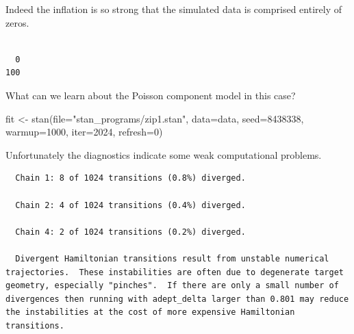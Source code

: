 \documentclass[
  letterpaper,
  DIV=11,
  numbers=noendperiod]{scrartcl}
\newenvironment{Shaded}{\begin{snugshade}}{\end{snugshade}}
\newcommand{\AttributeTok}[1]{\textcolor[rgb]{0.40,0.45,0.13}{#1}}
\newcommand{\DecValTok}[1]{\textcolor[rgb]{0.68,0.00,0.00}{#1}}
\newcommand{\FunctionTok}[1]{\textcolor[rgb]{0.28,0.35,0.67}{#1}}
\newcommand{\NormalTok}[1]{\textcolor[rgb]{0.00,0.23,0.31}{#1}}
\newcommand{\OtherTok}[1]{\textcolor[rgb]{0.00,0.23,0.31}{#1}}
\newcommand{\SpecialCharTok}[1]{\textcolor[rgb]{0.37,0.37,0.37}{#1}}
\newcommand{\StringTok}[1]{\textcolor[rgb]{0.13,0.47,0.30}{#1}}
\begin{document}
Indeed the inflation is so strong that the simulated data is comprised
entirely of zeros.

\begin{Shaded}
\end{Shaded}

\begin{verbatim}

  0 
100 
\end{verbatim}

What can we learn about the Poisson component model in this case?

\begin{Shaded}
\begin{Highlighting}[]
\NormalTok{fit }\OtherTok{\textless{}{-}} \FunctionTok{stan}\NormalTok{(}\AttributeTok{file=}\StringTok{"stan\_programs/zip1.stan"}\NormalTok{,}
            \AttributeTok{data=}\NormalTok{data, }\AttributeTok{seed=}\DecValTok{8438338}\NormalTok{,}
            \AttributeTok{warmup=}\DecValTok{1000}\NormalTok{, }\AttributeTok{iter=}\DecValTok{2024}\NormalTok{, }\AttributeTok{refresh=}\DecValTok{0}\NormalTok{)}
\end{Highlighting}
\end{Shaded}

Unfortunately the diagnostics indicate some weak computational problems.

\begin{Shaded}
\end{Shaded}

\begin{verbatim}
  Chain 1: 8 of 1024 transitions (0.8%) diverged.

  Chain 2: 4 of 1024 transitions (0.4%) diverged.

  Chain 4: 2 of 1024 transitions (0.2%) diverged.

  Divergent Hamiltonian transitions result from unstable numerical
trajectories.  These instabilities are often due to degenerate target
geometry, especially "pinches".  If there are only a small number of
divergences then running with adept_delta larger than 0.801 may reduce
the instabilities at the cost of more expensive Hamiltonian
transitions.
\end{verbatim}
\end{document}
